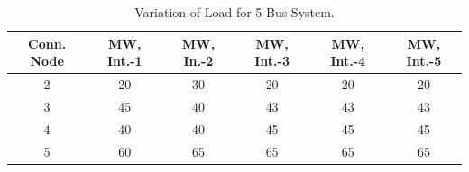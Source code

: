 \documentclass[preprint,12pt,3p]{elsarticle}
\begin{document}
\begin{table}[ht] 

\caption{Variation of Load for 5 Bus System.} %

\centering %

\begin{tabular}{| c | c | c | c | c | c |} %

\hline\hline %

Conn. Node & MW, Int.-1 & MW, In.-2 & MW, Int.-3  & MW, Int.-4 & MW, Int.-5 \\ [0.5ex] %


\hline %

2 &	20 &	30 &	20 &	20 &	20 \\ %
\hline
3 &	45 &	40 &	43 &	43 &	43 \\ %
\hline
4 &	40 &	40 &	45 &	45 &	45 \\ %
\hline
5 &	60 &	65 &	65 &	65 &	65 \\ %
\hline
\end{tabular} 

\label{table:5LASCOPFLoadModified} %

\end{table}
\end{document}

